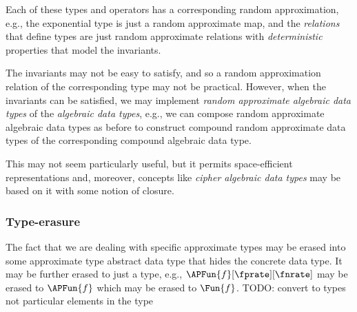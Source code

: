 \documentclass[ ../main.tex]{subfiles}
\begin{document}
	Each of these types and operators has a corresponding random approximation, e.g., the exponential type is just a random approximate map, and the \emph{relations} that define types are just random approximate relations with \emph{deterministic} properties that model the invariants.
	
	The invariants may not be easy to satisfy, and so a random approximation relation of the corresponding type may not be practical.
	However, when the invariants can be satisfied, we may implement \emph{random approximate algebraic data types} of the \emph{algebraic data types}, e.g., we can compose random approximate algebraic data types as before to construct compound random approximate data types of the corresponding compound algebraic data type.
	
	This may not seem particularly useful, but it permits space-efficient representations and, moreover, concepts like \emph{cipher algebraic data types} may be based on it with some notion of closure.
	
\subsubsection{Type-erasure}
The fact that we are dealing with specific approximate types may be erased into some approximate type abstract data type that hides the concrete data type.
It may be further erased to just a type, e.g., $\APFun{f}[\fprate][\fnrate]$ may be erased to $\APFun{f}$ which may be erased to $\Fun{f}$.
TODO: convert to types not particular elements in the type
	
\end{document}
